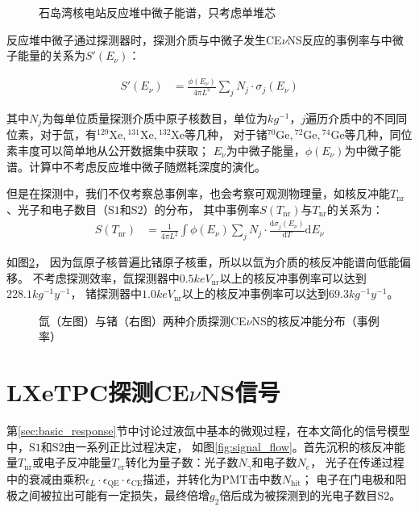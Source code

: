 \begin{figure}
    \centering
    
    \caption{\label{fig:neutrino_flux_spectrum} 石岛湾核电站反应堆中微子能谱，只考虑单堆芯}
\end{figure}

反应堆中微子通过探测器时，探测介质与中微子发生CE$\nu$NS反应的事例率与中微子能量的关系为$S'(E_\nu)$：

\begin{align}
    \label{eq:sevent_rate}
    S'(E_\nu) &= \frac{\phi(E_\nu)}{4\pi L^2}\sum_j N_j\cdot \sigma_j(E_\nu)
\end{align}

其中$N_j$为每单位质量探测介质中原子核数目，单位为$\si{kg^{-1}}$，$j$遍历介质中的不同同位素，对于氙，有${}^{129}\mathrm{Xe},{}^{131}\mathrm{Xe},{}^{132}\mathrm{Xe}$等几种，
对于锗${}^{70}\mathrm{Ge},{}^{72}\mathrm{Ge},{}^{74}\mathrm{Ge}$等几种，同位素丰度可以简单地从公开数据集中获取；
$E_\nu$为中微子能量，$\phi(E_\nu)$为中微子能谱。计算中不考虑反应堆中微子随燃耗深度的演化。

但是在探测中，我们不仅考察总事例率，也会考察可观测物理量，如核反冲能$T_{\mathrm{nr}}$、光子和电子数目（$\mathrm{S1}$和$\mathrm{S2}$）的分布，
其中事例率$S(T_{\mathrm{nr}})$与$T_{\mathrm{nr}}$的关系为：
\begin{align}
    \label{eq:tnr_event_rate}
    S(T_{\mathrm{nr}}) &= \frac{1}{4\pi L^2}\int\phi(E_\nu)\sum_j N_j\cdot \frac{\mathrm{d}\sigma_j(E_\nu)}{\mathrm{d}T}\mathrm{d}E_\nu
\end{align}

如图\ref{fig:cevns_event_rate}，
因为氙原子核普遍比锗原子核重，所以以氙为介质的核反冲能谱向低能偏移。
不考虑探测效率，氙探测器中$0.5\si{keV_{\mathrm{nr}}}$以上的核反冲事例率可以达到$228.1\si{kg^{-1}y^{-1}}$，
锗探测器中$1.0\si{keV_{\mathrm{nr}}}$以上的核反冲事例率可以达到$69.3\si{kg^{-1}y^{-1}}$。

\begin{figure}
    \centering
    
    \caption{\label{fig:cevns_event_rate} 氙（左图）与锗（右图）两种介质探测CE$\nu$NS的核反冲能分布（事例率）}
\end{figure}

\section{LXeTPC探测CE$\nu$NS信号}
\label{sec:lxe_signal}

第\ref{sec:basic_response}节中讨论过液氙中基本的微观过程，在本文简化的信号模型中，$\mathrm{S1}$和$\mathrm{S2}$由一系列正比过程决定，
如图\ref{fig:signal_flow}。首先沉积的核反冲能量$T_{\mathrm{nr}}$或电子反冲能量$T_{\mathrm{er}}$转化为量子数：光子数$N_\gamma$和电子数$N_e$，
光子在传递过程中的衰减由乘积$\epsilon_L\cdot\epsilon_\mathrm{QE}\cdot\epsilon_\mathrm{CE}$描述，并转化为PMT击中数$N_\mathrm{hit}$；
电子在门电极和阳极之间被拉出可能有一定损失，最终倍增$g_2$倍后成为被探测到的光电子数目$\mathrm{S2}$。

